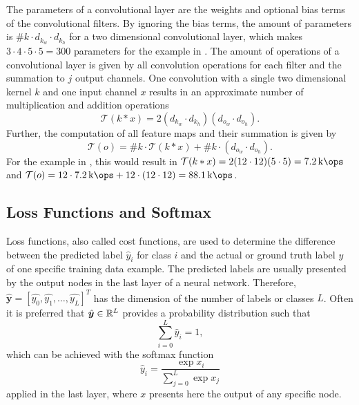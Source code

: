 The parameters of a convolutional layer are the weights and optional bias terms of the convolutional filters.
By ignoring the bias terms, the amount of parameters is $\#k \cdot d_{k_w} \cdot d_{k_h}$ for a two dimensional convolutional layer, which makes $3 \cdot 4 \cdot 5 \cdot 5 = 300$ parameters for the example in .
The amount of operations of a convolutional layer is given by all convolution operations for each filter and the summation to $j$ output channels.
One convolution with a single two dimensional kernel $k$ and one input channel $x$ results in an approximate number of multiplication and addition operations
\begin{equation}
  \mathcal{T}(k * x) = 2(d_{k_w} \cdot d_{k_h}) (d_{o_w} \cdot d_{o_h}).
\end{equation}
Further, the computation of all feature maps and their summation is given by
\begin{equation}
  \mathcal{T}(o) = \#k \cdot \mathcal{T}(k * x) + \#k \cdot (d_{o_w} \cdot d_{o_h}).
\end{equation}
For the example in , this would result in $\mathcal{T}(k * x) = 2 (12 \cdot 12) (5 \cdot 5) = \SI{7.2}{\kilo\ops}$ and $\mathcal{T}(o) = 12 \cdot \SI{7.2}{\kilo\ops} + 12 \cdot (12 \cdot 12) = \SI{88.1}{\kilo\ops}$.



\subsection{Loss Functions and Softmax}
Loss functions, also called cost functions, are used to determine the difference between the predicted label $\hat{y}_i$ for class $i$ and the actual or ground truth label $y$ of one specific training data example.
The predicted labels are usually presented by the output nodes in the last layer of a neural network.
Therefore, $\hat{\bm{y}} = [\hat{y_0}, \hat{y_1}, \dots, \hat{y_L}]^T$ has the dimension of the number of labels or classes $L$.
Often it is preferred that $\hat{\bm{y}} \in \mathbb{R}^L$ provides a probability distribution such that
\begin{equation}
  \sum_{i=0}^L \hat{y}_i = 1,
\end{equation}
which can be achieved with the softmax function
\begin{equation}\label{eq:nn_theory_softmax}
  \hat{y}_i = \frac{\exp{x_i}}{\sum_{j=0}^{L}\exp{x_j}}
\end{equation}
applied in the last layer, where $x$ presents here the output of any specific node.

